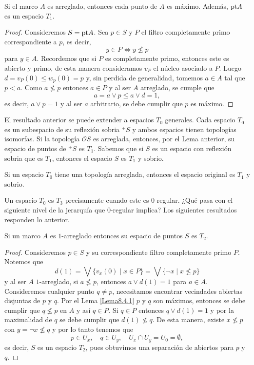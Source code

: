 \begin{lem}\label{Lema8.4.1}
    Si el marco $A$ es arreglado, entonces cada punto de $A$ es máximo. Además, $\mathrm{pt} A$ es un espacio $T_1$.
\end{lem}

\begin{proof}
    Consideremos $S=\mathrm{pt} A$. Sea $p\in S$ y $P$ el filtro completamente primo correspondiente a $p$, es decir, 
    \[
    y\in P\Leftrightarrow y\nleq p
    \]
    para $y\in A$. Recordemos que si $P$ es completamente primo, entonces este es abierto y primo, de esta manera consideramos $v_P$ el núcleo asociado a $P$. Luego $d=v_P(0)\leq w_p(0)=p$ y, sin perdida de generalidad, tomemos $a\in A$ tal que $p< a$. Como $a\nleq p$ entonces $a\in P$ y al ser $A$ arreglado, se cumple que 
    \[
    a=a\vee p\leq a\vee d=1,
    \]
    es decir, $a\vee p=1$ y al ser $a$ arbitrario, se debe cumplir que $p$ es máximo.
\end{proof}

El resultado anterior se puede extender a espacios $T_0$ generales. Cada espacio $T_0$ es un subespacio de su reflexión sobria $^+S$ y ambos espacios tienen topologías isomorfas. Si la topología $\mathcal{O}S$ es arreglada, entonces, por el Lema anterior, su espacio de puntos de $^+S$ es $T_1$. Sabemos que si $S$ es un espacio con reflexión sobria que es $T_1$, entonces el espacio $S$ es $T_1$ y sobrio.

\begin{lem}\label{Lema8.4.2}
    Si un espacio $T_0$ tiene una topología arreglada, entonces el espacio original es $T_1$ y sobrio.
\end{lem}

Un espacio $T_0$ es $T_3$ precisamente cuando este es $0$-regular. ¿Qué pasa con el siguiente nivel de la jerarquía que $0$-regular implica? Los siguientes resultados responden lo anterior. 

\begin{lem}\label{Lema8.4.3}
    Si un marco $A$ es $1$-arreglado entonces su espacio de puntos $S$ es $T_2$.
\end{lem}

\begin{proof}
    Consideremos $p\in S$ y su correspondiente filtro completamente primo $P$. Notemos que 
    \[
    d(1)=\bigvee\{v_x(0)\mid x\in P\}=\bigvee\{\neg x\mid x\nleq p\}
    \]
    y al ser $A$ $1$-arreglado, si $a\nleq p$, entonces $a\vee d(1)=1$ para $a\in A$. Consideremos cualquier punto $q\neq p$, necesitamos encontrar vecindades abiertas disjuntas de $p$ y $q$. Por el Lema \ref{Lema8.4.1} $p$ y $q$ son máximos, entonces se debe cumplir que $q\nleq p$ en $A$ y así $q\in P$. Si $q\in P$ entonces $q\vee d(1)=1$ y por la maximalidad de $q$ se debe cumplir que $d(1)\nleq q$. De esta manera, existe $x\nleq p$ con $y=\neg x\nleq q$ y por lo tanto tenemos que 
    \[
    p\in U_x,\quad q\in U_y,\quad U_x\cap U_y=U_0=\emptyset,
    \]
    es decir, $S$ es un espacio $T_2$, pues obtuvimos una separación de abiertos para $p$ y $q$.
\end{proof}

